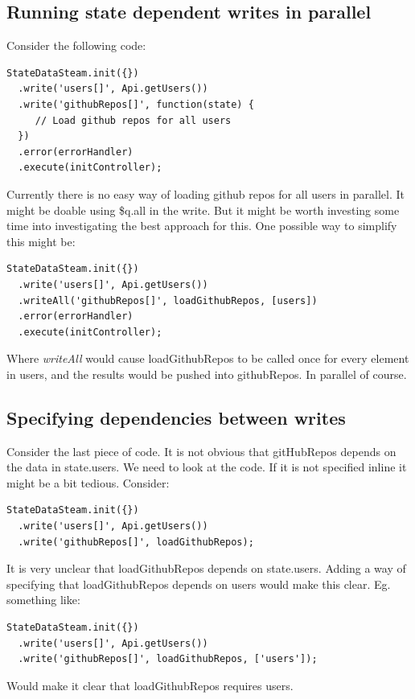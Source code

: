 \documentclass[a4paper,12pt]{article}
\begin{document}
\subsection{Running state dependent writes in parallel}
Consider the following code:
\begin{lstlisting}[caption=Executing the stream, frame=single]
StateDataSteam.init({})
  .write('users[]', Api.getUsers())
  .write('githubRepos[]', function(state) {
     // Load github repos for all users
  })
  .error(errorHandler)
  .execute(initController);
\end{lstlisting}
Currently there is no easy way of loading github repos for all users in parallel. It might be doable using \$q.all in the write. But it might be worth investing some time into investigating 
the best approach for this. One possible way to simplify this might be:

\begin{lstlisting}[caption=Executing the stream, frame=single]
StateDataSteam.init({})
  .write('users[]', Api.getUsers())
  .writeAll('githubRepos[]', loadGithubRepos, [users])
  .error(errorHandler)
  .execute(initController);
\end{lstlisting}
Where \emph{writeAll} would cause loadGithubRepos to be called once for every element in users, and the results would be pushed into githubRepos. In parallel of course.

\subsection{Specifying dependencies between writes}
Consider the last piece of code. It is not obvious that gitHubRepos depends on the data in state.users. We need to look at the code. If it is not specified inline it might be a bit tedious.
Consider:

\begin{lstlisting}[caption=Executing the stream, frame=single]
StateDataSteam.init({})
  .write('users[]', Api.getUsers())
  .write('githubRepos[]', loadGithubRepos);
\end{lstlisting}
It is very unclear that loadGithubRepos depends on state.users. Adding a way of specifying that loadGithubRepos depends on users would make this clear.
Eg. something like:
\begin{lstlisting}[caption=Executing the stream, frame=single]
StateDataSteam.init({})
  .write('users[]', Api.getUsers())
  .write('githubRepos[]', loadGithubRepos, ['users']);
\end{lstlisting}
Would make it clear that loadGithubRepos requires users.
\end{document}

